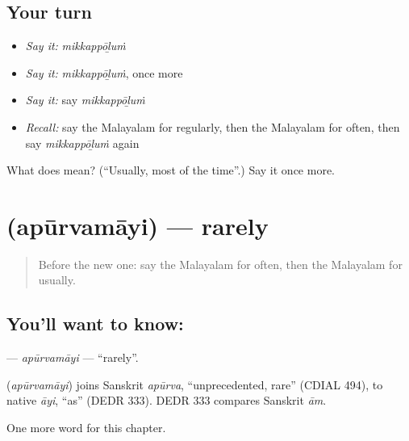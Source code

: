 \subsection*{Your turn}
\begin{itemize}
\raggedright
  \item \emph{Say it:} \emph{mikkappōḻuṁ}
  \item \emph{Say it:} \emph{mikkappōḻuṁ}, once more
  \item \emph{Say it:} say \emph{mikkappōḻuṁ}
  \item \emph{Recall:} say the Malayalam for regularly, then the Malayalam for often, then say \emph{mikkappōḻuṁ} again
\end{itemize}

\begin{tcolorbox}[breakable,colback=teal!4,colframe=teal!35!black,title={Before you move on}]
What does  mean? (\textquotedblleft{}Usually, most of the time\textquotedblright{}.) Say it once more.
\end{tcolorbox}
\section[\texorpdfstring{\ml{അപൂർവമായി} (apūrvamāyi)}{അപൂർവമായി (apūrvamāyi)}]{ (apūrvamāyi) — rarely}

\label{lesson:ML-C276-apurvamayi}



\begin{quote}
Before the new one: say the Malayalam for often, then the Malayalam for usually.
\end{quote}

\subsection*{You'll want to know: }
\textbf{} — \emph{apūrvamāyi} — \textquotedblleft{}rarely\textquotedblright{}.

\begin{cousinweb}
\textbf{} (\emph{apūrvamāyi}) joins Sanskrit \emph{apūrva}, \textquotedblleft{}unprecedented, rare\textquotedblright{} (CDIAL 494), to native \emph{āyi}, \textquotedblleft{}as\textquotedblright{} (DEDR 333). DEDR 333 compares Sanskrit \emph{ām}.
\end{cousinweb}

\begin{grammarlens}[title={What you've built}]
One more word for this chapter.
\end{grammarlens}

